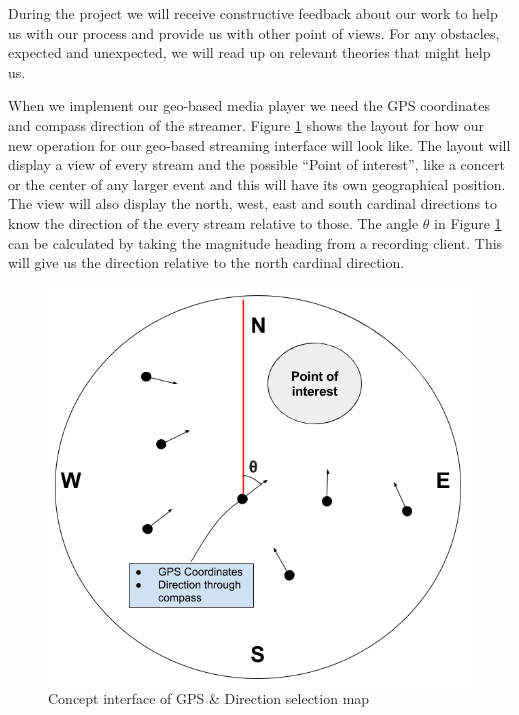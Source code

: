 \documentclass[9pt,a4paper]{acmproc}
\begin{document}
During the project we will receive constructive feedback about our work to help us with our process and provide us with other point of views. For any obstacles, expected and unexpected, we will read up on relevant theories that might help us.

When we implement our geo-based media player we need the GPS coordinates and compass direction of the streamer. Figure \ref{fig:gpsinterface} shows the layout for how our new operation for our geo-based streaming interface will look like. The layout will display a view of every stream and the possible “Point of interest”, like a concert or the center of any larger event and this will have its own geographical position. The view will also display the north, west, east and south cardinal directions to know the direction of the every stream relative to those. The angle $\theta$ in Figure \ref{fig:gpsinterface} can be calculated by taking the magnitude heading from a recording client. This will give us the direction relative to the north cardinal direction.

\begin{figure}[t!]
\begin{center}
	\includegraphics[scale=0.5]{teomet.png}
	\caption{Concept interface of GPS \& Direction selection map}
	\label{fig:gpsinterface}
\end{center}
\end{figure}
\end{document}
